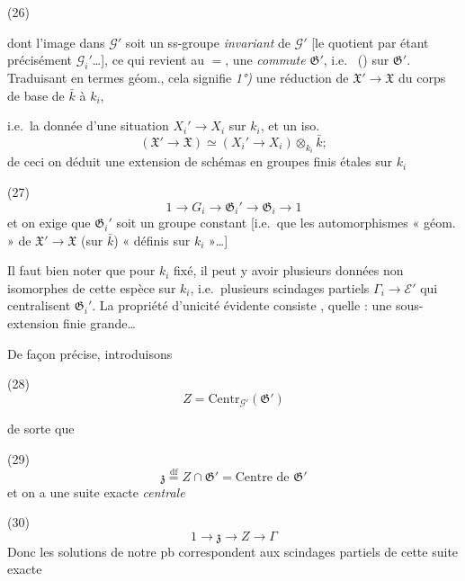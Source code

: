 \documentclass[11pt,a4paper]{article}
\begin{document}
(26)


dont l'image dans $\mathcal{G}'$ soit un ss-groupe \emph{invariant} de $\mathcal{G}'$ [le quotient par  étant précisément $\mathcal{G}_i'$\ldots], ce qui revient au $=$, une \ill{} \emph{commute}  $\mathfrak{G}'$, i.e.\  \emph{} () sur $\mathfrak{G}'$. Traduisant en termes géom., cela signifie  \emph{1°)} une réduction de $\mathfrak{X}' \to \mathfrak{X}$ du corps de base de $\bar{k}$ à $k_i$,

i.e.\ la donnée d'une situation $X_i' \to X_i$ sur $k_i$,  et un iso.
\[
  (\mathfrak{X}' \to \mathfrak{X}) \simeq (X_i' \to X_i) \otimes_{k_i} \bar{k} ;
\]
de ceci on déduit une extension de schémas en groupes finis étales sur $k_i$

(27)
\[
  1 \to G_i \to \mathfrak{G}_i' \to \mathfrak{G}_i \to 1
\]
et on exige que $\mathfrak{G}_i'$ soit un groupe constant [i.e.\ que les automorphismes « géom. » de $\mathfrak{X}' \to \mathfrak{X}$ (sur $\bar{k}$)  « définis sur $k_i$ »\ldots]

Il faut bien noter que pour $k_i$ fixé, il peut y avoir plusieurs données non isomorphes de cette espèce sur $k_i$, i.e.\ plusieurs scindages partiels $\Gamma_i \to \mathcal{E}'$ qui centralisent $\mathfrak{G}_i'$.  La propriété d'unicité  évidente consiste   , quelle :  une sous-extension finie  grande\ldots

De façon précise, introduisons

(28)
\[
  Z = \mathrm{Centr}_{\mathcal{G}'}(\mathfrak{G}')
\]

de sorte que

(29)
\[
  \mathfrak{z} \overset{\mathrm{df}}{=} Z \cap \mathfrak{G}' = \text{Centre de } \mathfrak{G}'
\]
et on a une suite exacte \emph{centrale}

(30)
\[
  1 \to \mathfrak{z} \longrightarrow Z \longrightarrow \Gamma
\]
Donc les solutions de notre pb  correspondent aux scindages partiels de cette suite exacte
\end{document}
